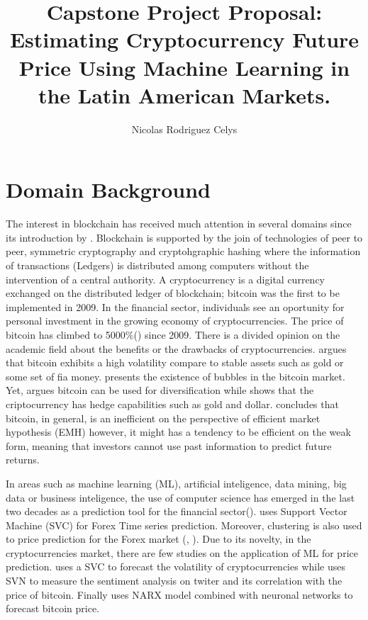 \documentclass{article}
\title{Capstone Project Proposal: Estimating Cryptocurrency Future Price Using Machine Learning in the Latin American Markets.}
\author{Nicolas Rodriguez Celys}
\begin{document}
\maketitle


\section{Domain Background}\label{domain}

The interest in blockchain has received much attention in several domains since its introduction by \cite{ARTICLE:1}. Blockchain is supported by the join of technologies of peer to peer, symmetric cryptography and cryptohgraphic hashing where the information of transactions (Ledgers) is distributed among computers without the intervention of a central authority. A cryptocurrency is a digital currency exchanged on the distributed ledger of blockchain; bitcoin was the first to be implemented in 2009. In the financial sector, individuals see an oportunity for personal investment in the growing economy of cryptocurrencies. The price of bitcoin has climbed to 5000\%(\cite{ARTICLE:2}) since 2009. There is a divided opinion on the academic field about the benefits or the drawbacks of cryptocurrencies. \cite{ARTICLE:3}  argues that bitcoin exhibits a high volatility compare to stable assets such as gold or some set of fia money. \cite{ARTICLE:3} presents  the existence of bubbles in the bitcoin market. Yet, \cite{ARTICLE:4} argues bitcoin can be used for diversification while \cite{ARTICLE:5}  shows that the criptocurrency has hedge capabilities such as gold and dollar. \cite{ARTICLE:2} concludes that bitcoin, in general, is an inefficient on the perspective of efficient market hypothesis (EMH) \cite{ARTICLE:6} however, it might has a tendency to be efficient on the weak form, meaning that investors cannot use past information to predict future returns.

In areas such as machine learning (ML), artificial inteligence, data mining, big data or business inteligence, the use of computer science has emerged in the last two decades as a prediction tool for the financial sector(\cite{ARTICLE:7}). \cite{ARTICLE:8} uses Support Vector Machine (SVC) for Forex Time series prediction. Moreover, clustering is also used to price prediction for the Forex market (\cite{ARTICLE:10}, \cite{ARTICLE:11}). Due to its novelty, in the cryptocurrencies market, there are few studies on the application of ML for price prediction. \cite{ARTICLE:12} uses a SVC  to forecast the volatility of cryptocurrencies while \cite{ARTICLE:16} uses SVN to measure the sentiment analysis on twiter and its correlation with the price of bitcoin. Finally \cite{ARTICLE:17} uses NARX model combined with neuronal networks to forecast bitcoin price.
\end{document}
